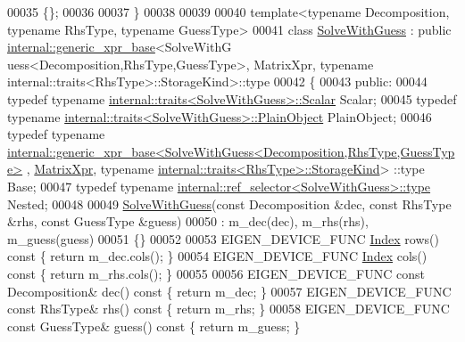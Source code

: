 \begin{DoxyCode}
00035 \{\};
00036 
00037 \}
00038 
00039 
00040 \textcolor{keyword}{template}<\textcolor{keyword}{typename} Decomposition, \textcolor{keyword}{typename} RhsType, \textcolor{keyword}{typename} GuessType>
00041 \textcolor{keyword}{class }\hyperlink{group___iterative_linear_solvers___module_class_eigen_1_1_solve_with_guess}{SolveWithGuess} : \textcolor{keyword}{public} \hyperlink{struct_eigen_1_1internal_1_1generic__xpr__base}{internal::generic\_xpr\_base}<SolveWithG
      uess<Decomposition,RhsType,GuessType>, MatrixXpr, typename internal::traits<RhsType>::StorageKind>::type
00042 \{
00043 \textcolor{keyword}{public}:
00044   \textcolor{keyword}{typedef} \textcolor{keyword}{typename} \hyperlink{struct_eigen_1_1internal_1_1traits}{internal::traits<SolveWithGuess>::Scalar} Scalar;
00045   \textcolor{keyword}{typedef} \textcolor{keyword}{typename} \hyperlink{struct_eigen_1_1internal_1_1traits}{internal::traits<SolveWithGuess>::PlainObject}
       PlainObject;
00046   \textcolor{keyword}{typedef} \textcolor{keyword}{typename} 
      \hyperlink{struct_eigen_1_1internal_1_1generic__xpr__base}{internal::generic\_xpr\_base<SolveWithGuess<Decomposition,RhsType,GuessType>}
      , \hyperlink{struct_eigen_1_1_matrix_xpr}{MatrixXpr}, \textcolor{keyword}{typename} \hyperlink{struct_eigen_1_1internal_1_1traits}{internal::traits<RhsType>::StorageKind}>
      ::type Base;
00047   \textcolor{keyword}{typedef} \textcolor{keyword}{typename} \hyperlink{class_eigen_1_1internal_1_1_tensor_lazy_evaluator_writable}{internal::ref\_selector<SolveWithGuess>::type}
       Nested;
00048   
00049   \hyperlink{group___iterative_linear_solvers___module_class_eigen_1_1_solve_with_guess}{SolveWithGuess}(\textcolor{keyword}{const} Decomposition &dec, \textcolor{keyword}{const} RhsType &rhs, \textcolor{keyword}{const} GuessType &guess)
00050     : m\_dec(dec), m\_rhs(rhs), m\_guess(guess)
00051   \{\}
00052   
00053   EIGEN\_DEVICE\_FUNC \hyperlink{namespace_eigen_a62e77e0933482dafde8fe197d9a2cfde}{Index} rows()\textcolor{keyword}{ const }\{ \textcolor{keywordflow}{return} m\_dec.cols(); \}
00054   EIGEN\_DEVICE\_FUNC \hyperlink{namespace_eigen_a62e77e0933482dafde8fe197d9a2cfde}{Index} cols()\textcolor{keyword}{ const }\{ \textcolor{keywordflow}{return} m\_rhs.cols(); \}
00055 
00056   EIGEN\_DEVICE\_FUNC \textcolor{keyword}{const} Decomposition& dec()\textcolor{keyword}{   const }\{ \textcolor{keywordflow}{return} m\_dec; \}
00057   EIGEN\_DEVICE\_FUNC \textcolor{keyword}{const} RhsType&       rhs()\textcolor{keyword}{   const }\{ \textcolor{keywordflow}{return} m\_rhs; \}
00058   EIGEN\_DEVICE\_FUNC \textcolor{keyword}{const} GuessType&     guess()\textcolor{keyword}{ const }\{ \textcolor{keywordflow}{return} m\_guess; \}

\end{DoxyCode}
